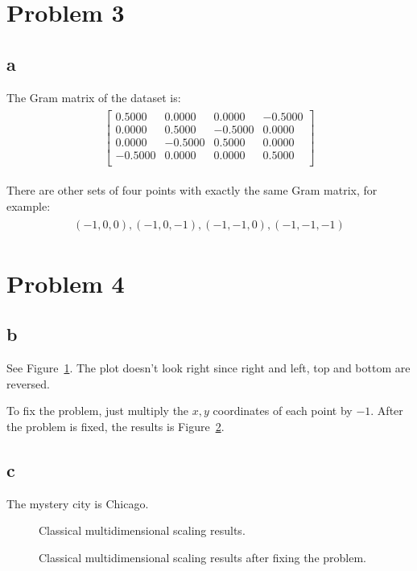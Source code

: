 \documentclass[a4paper,11pt]{article}
\theoremstyle{mytheor}
\begin{document}
\section*{Problem 3}
\subsection*{a}
The Gram matrix of the dataset is:
\begin{align}
    \begin{split}
        \begin{bmatrix}
           0.5000  &  0.0000 &   0.0000   &-0.5000 \\
           0.0000  &  0.5000 &  -0.5000 &   0.0000 \\
           0.0000 & -0.5000  &  0.5000   & 0.0000 \\
           -0.5000 &   0.0000  &  0.0000 &   0.5000 \\
        \end{bmatrix}
    \end{split}
\end{align}

There are other sets of four points with exactly the same Gram matrix, for example:
\begin{align}
\begin{split}
(-1, 0,0), (-1, 0, -1), (-1, -1, 0), (-1, -1, -1)
\end{split}
\end{align}

\section*{Problem 4}
\subsection*{b}
See Figure~\ref{fig:4b0}. The plot doesn't look right since right and left, top and bottom are reversed.

To fix the problem, just multiply the $x,y$ coordinates of each point by $-1$. After the problem is fixed,
the results is Figure~\ref{fig:4b1}.

\subsection*{c}
The mystery city is Chicago.

\begin{figure}[h]
    \caption{Classical multidimensional scaling results.}
    \label{fig:4b0}
\end{figure}


\begin{figure}[h]
    \caption{Classical multidimensional scaling results after fixing the problem.}
    \label{fig:4b1}
\end{figure}
\end{document}
